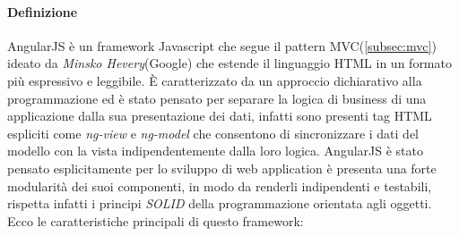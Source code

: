 \paragraph*{Definizione}
AngularJS è un framework Javascript che segue il pattern MVC(\ref{subsec:mvc}) ideato da \emph{Minsko Hevery}(Google) che estende il linguaggio HTML in un formato più espressivo e leggibile. È caratterizzato da un approccio dichiarativo alla programmazione ed è stato pensato per separare la logica di business di una applicazione dalla sua presentazione dei dati, infatti sono presenti tag HTML espliciti come \emph{ng-view} e \emph{ng-model} che consentono di sincronizzare i dati del modello con la vista indipendentemente dalla loro logica. AngularJS è stato pensato esplicitamente per lo sviluppo di web application è presenta una forte modularità dei suoi componenti, in modo da renderli indipendenti e testabili, rispetta infatti i principi \emph{SOLID} della programmazione orientata agli oggetti.
Ecco le caratteristiche principali di questo framework:

